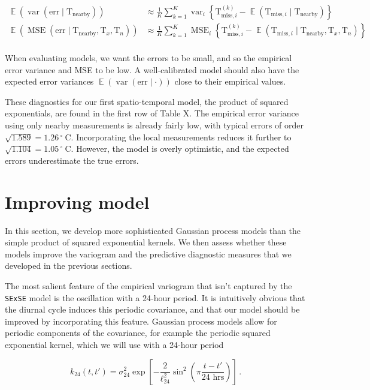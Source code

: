 \documentclass[letter]{article}
\newcommand{\genericdel}[3]{%
      \left#1#3\right#2
    }
\newcommand{\del}[1]{\genericdel(){#1}}
\newcommand{\sbr}[1]{\genericdel[]{#1}}
\newcommand{\cbr}[1]{\genericdel\{\}{#1}}
\DeclareMathOperator{\E}{\mathbb{E}}
\DeclareMathOperator{\var}{{var}}
\DeclareMathOperator{\mse}{{MSE}}
\newcommand{\T}{\mathrm{T}}
\newcommand{\Tn}{\T_{n}}
\newcommand{\Tx}{\T_{x}}
\newcommand{\degreeC}{{}^{\circ}~\mathrm{C}}
\newcommand{\miss}{\mathrm{miss}}
\newcommand{\obs}{\mathrm{nearby}}
\newcommand{\error}{\mathrm{err}}
\begin{document}
\begin{equation}
\begin{split}
    \E \del{\var\del{\error \mid \T_\obs}} &\approx \frac{1}{K} \sum_{k=1}^K \var_i \cbr{\T^{(k)}_{\miss,i} - \E\del{\T_{\miss,i} \mid \T_\obs}} \\
    \E \del{\mse\del{\error \mid \T_\obs,\Tx,\Tn}} &\approx \frac{1}{K} \sum_{k=1}^K \mse_i \cbr{\T^{(k)}_{\miss,i} - \E\del{\T_{\miss,i} \mid \T_\obs,\Tx,\Tn}} \\
\end{split}
\end{equation}

When evaluating models, we want the errors to be small, and so the
empirical error variance and MSE to be low. A well-calibrated model
should also have the expected error variances
\(\E \del{\var\del{\error \mid \cdot}}\) close to their empirical
values.

These diagnostics for our first spatio-temporal model, the product of
squared exponentials, are found in the first row of Table X. The
empirical error variance using only nearby measurements is already
fairly low, with typical errors of order
\(\sqrt{1.589}=1.26\,\degreeC\). Incorporating the local measurements
reduces it further to \(\sqrt{1.104}=1.05\,\degreeC\). However, the
model is overly optimistic, and the expected errors underestimate the
true errors.
    


    	\section{Improving model}\label{improving-model}

In this section, we develop more sophisticated Gaussian process models
than the simple product of squared exponential kernels. We then assess
whether these models improve the variogram and the predictive diagnostic
measures that we developed in the previous sections.

The most salient feature of the empirical variogram that isn't captured
by the \texttt{SExSE} model is the oscillation with a 24-hour period. It
is intuitively obvious that the diurnal cycle induces this periodic
covariance, and that our model should be improved by incorporating this
feature. Gaussian process models allow for periodic components of the
covariance, for example the periodic squared exponential kernel, which
we will use with a 24-hour period

\begin{equation}
    k_{24}(t,t') = \sigma_{24}^2 \exp\sbr{ - \frac{2}{\ell_{24}^2} \sin^2\del{
        \pi \frac{t-t'}{\text{24 hrs}} 
        }}\,.
\end{equation}
\end{document}
